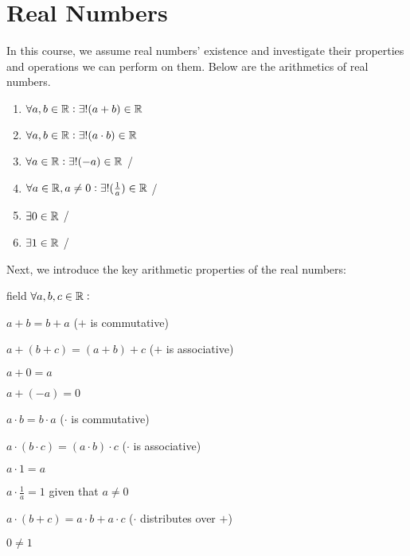 \documentclass{styles/tufte}
\author{Jiaming (George) Yu}
\date{\today}
\begin{document}
\maketitle
\tableofcontents
\newpage



\section{Real Numbers}

  In this course, we assume real numbers' existence and investigate their properties and operations we can perform on them. Below are the arithmetics of real numbers.
  \begin{enumerate}
    \item $\forall a, b \in \mathbb{R} : \exists! (a + b) \in \mathbb{R}$ \hfill {}
    \item $\forall a, b \in \mathbb{R} : \exists! (a \cdot b) \in \mathbb{R}$ \hfill {}
    \item $\forall a \in \mathbb{R} : \exists! (-a) \in \mathbb{R}$ \hfill {} / 
    \item $\forall a \in \mathbb{R}, a \neq 0 : \exists! (\frac{1}{a}) \in \mathbb{R}$ \hfill {} / 
    \item $\exists 0 \in \mathbb{R}$ \hfill {} / 
    \item $\exists 1 \in \mathbb{R}$ \hfill {} / 
  \end{enumerate}
  
  Next, we introduce the key arithmetic properties of the real numbers:
  \begin{axiom}{}{field}
    $\forall a, b, c \in \mathbb{R} :$
    \begin{romanenum}
      \item $a + b = b + a$ \hfill ($+$ is commutative)
      \item $a + (b + c) = (a + b) + c$ \hfill ($+$ is associative)
      \item $a + 0 = a$
      \item $a + (-a) = 0$
      \item $a \cdot b = b \cdot a$ \hfill ($\cdot$ is commutative)
      \item $a \cdot (b \cdot c) = (a \cdot b) \cdot c$ \hfill ($\cdot$ is associative)
      \item $a \cdot 1 = a$
      \item $a \cdot \frac{1}{a} = 1$ given that $a \neq 0$
      \item $a \cdot (b + c) = a \cdot b + a \cdot c$ \hfill($\cdot$ distributes over $+$)
      \item $0 \neq 1$
    \end{romanenum}
  \end{axiom}
  
\end{document}
